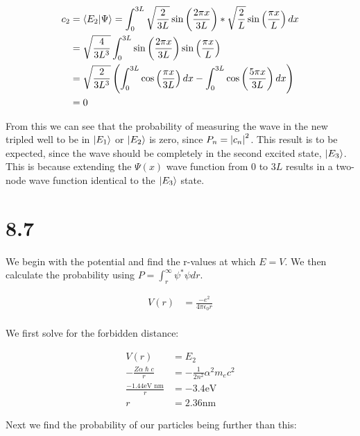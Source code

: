 \documentclass[10pt]{article} %
\begin{document}
\begin{align*}
  c_2 &= \braket{E_2}{\Psi} = \int_0^{3L} \sqrt{\frac{2}{3L}}\sin\left(\frac{2\pi x}{3L}\right)*
  \sqrt{\frac{2}{L}}\sin\left(\frac{\pi x}{L}\right)dx\\
  &= \sqrt{\frac{4}{3L^3}}\int_0^{3L}
  \sin\left(\frac{2\pi x}{3L}\right)\sin\left(\frac{\pi x}{L}\right)\\
  &= \sqrt{\frac{2}{3L^3}}\left(\int_0^{3L} \cos\left(\frac{\pi x}{3L}\right)dx
  - \int_0^{3L} \cos\left(\frac{5\pi x}{3L}\right)dx\right)\\
  &= 0\\
\end{align*}

From this we can see that the probability of measuring the wave in the new tripled well to be in
$\ket{E_1}$ or $\ket{E_2}$ is zero, since $P_n = \abs{c_n}^2$. This result is to be expected, since
the wave should be completely in the second excited state, $\ket{E_3}$. This is because extending
the $\Psi(x)$ wave function from $0$ to $3L$ results in a two-node wave function identical to the
$\ket{E_3}$ state.\\

\section{8.7}
We begin with the potential and find the r-values at which $E=V$. We then calculate
the probability using $P = \int_r^\infty \psi^* \psi dr$.

\begin{align*}
  V(r) &= \frac{-e^2}{4\pi\epsilon_0r}\\
\end{align*}

We first solve for the forbidden distance:

\begin{align*}
  V(r) &= E_2\\
  -\frac{Z\alpha\hslash c}{r} &= -\frac{1}{2n^2}\alpha^2m_ec^2\\
  \frac{-1.44 \mbox{eV nm}}{r} &= -3.4 \mbox{eV}\\
  r &= 2.36 \mbox{nm}
\end{align*}

Next we find the probability of our particles being further than this:
\end{document}
